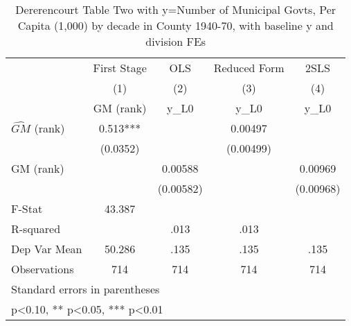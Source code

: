 \begin{table}[htbp]\centering
\def\sym#1{\ifmmode^{#1}\else\(^{#1}\)\fi}
\caption{Dererencourt Table Two with y=Number of Municipal Govts, Per Capita (1,000) by decade in County 1940-70, with baseline y and division FEs}
\begin{tabular}{l*{4}{c}}
\toprule
                    & First Stage   &         OLS   &Reduced Form   &        2SLS   \\
                    &\multicolumn{1}{c}{(1)}&\multicolumn{1}{c}{(2)}&\multicolumn{1}{c}{(3)}&\multicolumn{1}{c}{(4)}\\
                    &\multicolumn{1}{c}{GM  (rank)}&\multicolumn{1}{c}{y\_L0}&\multicolumn{1}{c}{y\_L0}&\multicolumn{1}{c}{y\_L0}\\
\midrule
$\hat{GM}$ (rank)   &       0.513***&               &     0.00497   &               \\
                    &    (0.0352)   &               &   (0.00499)   &               \\
\addlinespace
GM  (rank)          &               &     0.00588   &               &     0.00969   \\
                    &               &   (0.00582)   &               &   (0.00968)   \\
\midrule
F-Stat              &      43.387   &               &               &               \\
R-squared           &               &        .013   &        .013   &               \\
Dep Var Mean        &      50.286   &        .135   &        .135   &        .135   \\
Observations        &         714   &         714   &         714   &         714   \\
\bottomrule
\multicolumn{5}{l}{\footnotesize Standard errors in parentheses}\\
\multicolumn{5}{l}{\footnotesize * p<0.10, ** p<0.05, *** p<0.01}\\
\end{tabular}
\end{table}
